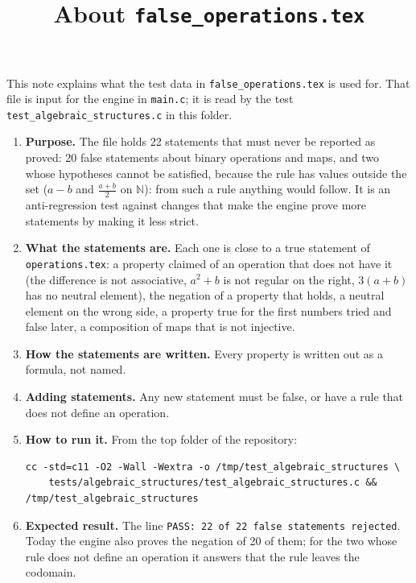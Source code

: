 \documentclass[11pt,a4paper]{article}
\title{About \texttt{false\_operations.tex}}
\author{}
\date{}
\begin{document}
\maketitle
This note explains what the test data in \texttt{false\_operations.tex} is used for. That file is input for the engine in \texttt{main.c}; it is read by the test \texttt{test\_algebraic\_structures.c} in this folder.

\begin{enumerate}
\item \textbf{Purpose.} The file holds 22 statements that must never be reported as proved: 20 false statements about binary operations and maps, and two whose hypotheses cannot be satisfied, because the rule has values outside the set ($a - b$ and $\frac{a + b}{2}$ on $\mathbb{N}$): from such a rule anything would follow. It is an anti-regression test against changes that make the engine prove more statements by making it less strict.

\item \textbf{What the statements are.} Each one is close to a true statement of \texttt{operations.tex}: a property claimed of an operation that does not have it (the difference is not associative, $a^{2} + b$ is not regular on the right, $3(a + b)$ has no neutral element), the negation of a property that holds, a neutral element on the wrong side, a property true for the first numbers tried and false later, a composition of maps that is not injective.

\item \textbf{How the statements are written.} Every property is written out as a formula, not named.

\item \textbf{Adding statements.} Any new statement must be false, or have a rule that does not define an operation.

\item \textbf{How to run it.} From the top folder of the repository:
\begin{verbatim}
cc -std=c11 -O2 -Wall -Wextra -o /tmp/test_algebraic_structures \
    tests/algebraic_structures/test_algebraic_structures.c && /tmp/test_algebraic_structures
\end{verbatim}

\item \textbf{Expected result.} The line \texttt{PASS: 22 of 22 false statements rejected}. Today the engine also proves the negation of 20 of them; for the two whose rule does not define an operation it answers that the rule leaves the codomain.
\end{enumerate}
\end{document}
